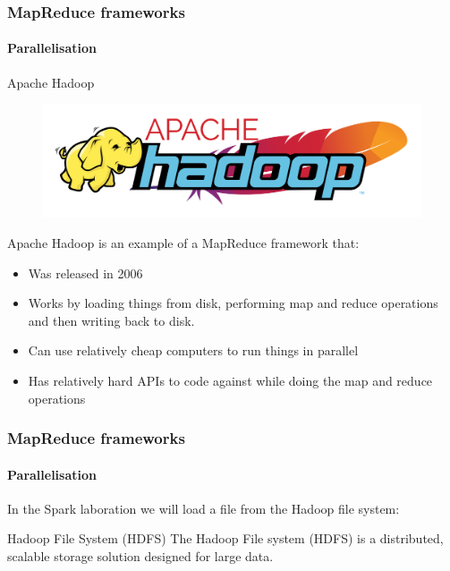 \documentclass[aspectratio=169,usenames,dvipsnames]{beamer}
\begin{document}
    \begin{frame}
        \frametitle{MapReduce frameworks}
        \framesubtitle{Parallelisation}
        \begin{block}{Apache Hadoop}
        \begin{figure}
        \vspace{-1.2\baselineskip}
        \includegraphics[width=1\linewidth]{figures/hadoop.png}
        \end{figure}
        Apache Hadoop is an example of a MapReduce framework that:
        \begin{itemize}
            \item Was \alert{released in 2006}
            \item Works by loading things \alert{from disk}, performing map and reduce operations and then \alert{writing back to disk}.
            \item Can use relatively \alert{cheap computers} to run things in \alert{parallel}
            \item Has relatively \alert{hard APIs to code against} while doing the map and reduce operations
        \end{itemize}
        \end{block}
    \end{frame}

    \begin{frame}
        \frametitle{MapReduce frameworks}
        \framesubtitle{Parallelisation}
        \centering
        In the Spark laboration we will load a file from the Hadoop file system:
        \begin{block}{Hadoop File System (HDFS)}
            The Hadoop File system (HDFS) is a \alert{distributed},
            \alert{scalable} storage solution designed for large data.
        \end{block}
    \end{frame}
    
\end{document}
